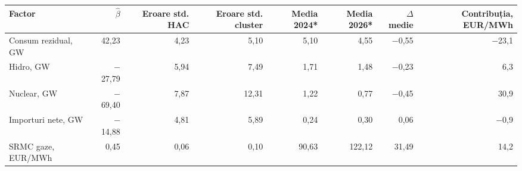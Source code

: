 \begin{tabular}{lrrrrrrr}
\toprule
Factor & $\hat\beta$ & Eroare std. HAC & Eroare std. cluster & Media 2024* & Media 2026* & $\Delta$ medie & Contribuția, EUR/MWh \\
\midrule
Consum rezidual, GW & 42,23 & 4,23 & 5,10 & 5,10 & 4,55 & $-$0,55 & $-$23,1 \\
Hidro, GW & $-$27,79 & 5,94 & 7,49 & 1,71 & 1,48 & $-$0,23 & 6,3 \\
Nuclear, GW & $-$69,40 & 7,87 & 12,31 & 1,22 & 0,77 & $-$0,45 & 30,9 \\
Importuri nete, GW & $-$14,88 & 4,81 & 5,89 & 0,24 & 0,30 & 0,06 & $-$0,9 \\
SRMC gaze, EUR/MWh & 0,45 & 0,06 & 0,10 & 90,63 & 122,12 & 31,49 & 14,2 \\
\bottomrule
\end{tabular}
